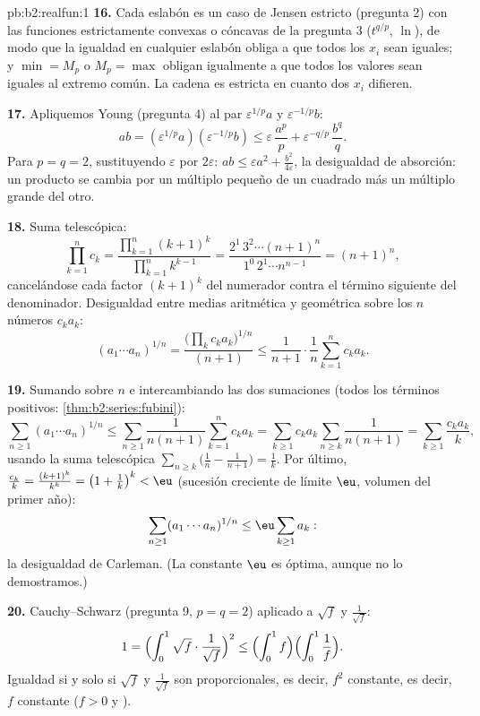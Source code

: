 \begin{solution}{pb:b2:realfun:1}
\textbf{16.} Cada eslabón es un caso de Jensen estricto (pregunta
2) con las funciones estrictamente convexas o cóncavas de la
pregunta 3 ($t^{q/p}$, $\ln$), de modo que la igualdad en cualquier
eslabón obliga a que todos los $x_i$ sean iguales; y $\min = M_p$ o
$M_p = \max$ obligan igualmente a que todos los valores sean iguales
al extremo común. La cadena es estricta en cuanto dos $x_i$
difieren.

\textbf{17.} Apliquemos Young (pregunta 4) al par
$\varepsilon^{1/p}a$ y $\varepsilon^{-1/p}b$:
\[
ab = (\varepsilon^{1/p}a)(\varepsilon^{-1/p}b)
\leq \varepsilon\,\frac{a^p}p +
\varepsilon^{-q/p}\,\frac{b^q}q .
\]
Para $p = q = 2$, sustituyendo $\varepsilon$ por $2\varepsilon$:
$ab \leq \varepsilon a^2 + \frac{b^2}{4\varepsilon}$, la
desigualdad de absorción: un producto se cambia por un múltiplo
pequeño de un cuadrado más un múltiplo grande del otro.

\textbf{18.} Suma telescópica:
\[
\prod_{k=1}^{n}c_k = \frac{\prod_{k=1}^n(k+1)^k}
{\prod_{k=1}^{n}k^{k-1}}
= \frac{2^1\,3^2\cdots(n+1)^n}{1^0\,2^1\cdots n^{n-1}}
= (n+1)^n,
\]
cancelándose cada factor $(k+1)^k$ del numerador contra el término
siguiente del denominador. Desigualdad entre medias aritmética y
geométrica sobre los $n$ números $c_ka_k$:
\[
(a_1\cdots a_n)^{1/n} =
\frac{\bigl(\prod_k c_ka_k\bigr)^{1/n}}{(n+1)}
\leq \frac{1}{n+1}\cdot\frac1n\sum_{k=1}^{n}c_ka_k .
\]

\textbf{19.} Sumando sobre $n$ e intercambiando las dos sumaciones
(todos los términos positivos: \cref{thm:b2:series:fubini}):
\[
\sum_{n\geq1}(a_1\cdots a_n)^{1/n}
\leq \sum_{n\geq1}\frac{1}{n(n+1)}\sum_{k=1}^{n}c_ka_k
= \sum_{k\geq1}c_ka_k\sum_{n\geq k}\frac1{n(n+1)}
= \sum_{k\geq1}\frac{c_ka_k}{k},
\]
usando la suma telescópica $\sum_{n\geq k}\bigl(\frac1n -
\frac1{n+1}\bigr) = \frac1k$. Por último, $\frac{c_k}k =
\frac{(k+1)^k}{k^k} = \bigl(1 + \frac1k\bigr)^k < \eu$ (sucesión
creciente de límite $\eu$, volumen del primer año):
\[
\sum_{n\geq1}(a_1\cdots a_n)^{1/n} \leq
\eu\sum_{k\geq1}a_k :
\]
la desigualdad de Carleman. (La constante $\eu$ es óptima, aunque
no lo demostramos.)

\textbf{20.} Cauchy--Schwarz (pregunta 9, $p = q = 2$) aplicado a
$\sqrt f$ y $\frac1{\sqrt f}$:
\[
1 = \Bigl(\int_0^1\sqrt f\cdot\frac{1}{\sqrt f}\Bigr)^{2}
\leq \Bigl(\int_0^1 f\Bigr)\Bigl(\int_0^1\frac1f\Bigr).
\]
Igualdad si y solo si $\sqrt f$ y $\frac1{\sqrt f}$ son
proporcionales, es decir, $f^2$ constante, es decir, $f$ constante
($f > 0$ y ).


\end{solution}
